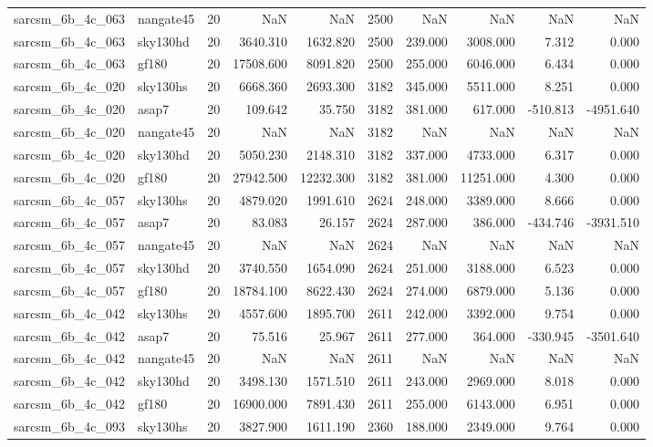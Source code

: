\documentclass{article}
\begin{document}
\begin{longtable}{llrrrrrrrr}
sarcsm\_6b\_4c\_063 & nangate45 & 20 & NaN & NaN & 2500 & NaN & NaN & NaN & NaN \\
sarcsm\_6b\_4c\_063 & sky130hd & 20 & 3640.310 & 1632.820 & 2500 & 239.000 & 3008.000 & 7.312 & 0.000 \\
sarcsm\_6b\_4c\_063 & gf180 & 20 & 17508.600 & 8091.820 & 2500 & 255.000 & 6046.000 & 6.434 & 0.000 \\
sarcsm\_6b\_4c\_020 & sky130hs & 20 & 6668.360 & 2693.300 & 3182 & 345.000 & 5511.000 & 8.251 & 0.000 \\
sarcsm\_6b\_4c\_020 & asap7 & 20 & 109.642 & 35.750 & 3182 & 381.000 & 617.000 & -510.813 & -4951.640 \\
sarcsm\_6b\_4c\_020 & nangate45 & 20 & NaN & NaN & 3182 & NaN & NaN & NaN & NaN \\
sarcsm\_6b\_4c\_020 & sky130hd & 20 & 5050.230 & 2148.310 & 3182 & 337.000 & 4733.000 & 6.317 & 0.000 \\
sarcsm\_6b\_4c\_020 & gf180 & 20 & 27942.500 & 12232.300 & 3182 & 381.000 & 11251.000 & 4.300 & 0.000 \\
sarcsm\_6b\_4c\_057 & sky130hs & 20 & 4879.020 & 1991.610 & 2624 & 248.000 & 3389.000 & 8.666 & 0.000 \\
sarcsm\_6b\_4c\_057 & asap7 & 20 & 83.083 & 26.157 & 2624 & 287.000 & 386.000 & -434.746 & -3931.510 \\
sarcsm\_6b\_4c\_057 & nangate45 & 20 & NaN & NaN & 2624 & NaN & NaN & NaN & NaN \\
sarcsm\_6b\_4c\_057 & sky130hd & 20 & 3740.550 & 1654.090 & 2624 & 251.000 & 3188.000 & 6.523 & 0.000 \\
sarcsm\_6b\_4c\_057 & gf180 & 20 & 18784.100 & 8622.430 & 2624 & 274.000 & 6879.000 & 5.136 & 0.000 \\
sarcsm\_6b\_4c\_042 & sky130hs & 20 & 4557.600 & 1895.700 & 2611 & 242.000 & 3392.000 & 9.754 & 0.000 \\
sarcsm\_6b\_4c\_042 & asap7 & 20 & 75.516 & 25.967 & 2611 & 277.000 & 364.000 & -330.945 & -3501.640 \\
sarcsm\_6b\_4c\_042 & nangate45 & 20 & NaN & NaN & 2611 & NaN & NaN & NaN & NaN \\
sarcsm\_6b\_4c\_042 & sky130hd & 20 & 3498.130 & 1571.510 & 2611 & 243.000 & 2969.000 & 8.018 & 0.000 \\
sarcsm\_6b\_4c\_042 & gf180 & 20 & 16900.000 & 7891.430 & 2611 & 255.000 & 6143.000 & 6.951 & 0.000 \\
sarcsm\_6b\_4c\_093 & sky130hs & 20 & 3827.900 & 1611.190 & 2360 & 188.000 & 2349.000 & 9.764 & 0.000 \\

\end{longtable}
\end{document}
